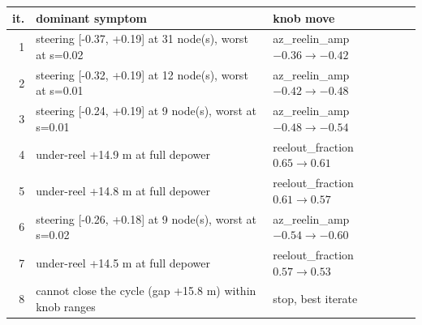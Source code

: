 \begin{tabular}{rp{}l}
\toprule
it. & dominant symptom & knob move \\
\midrule
1 & steering [-0.37, +0.19] at 31 node(s), worst at s=0.02 & az\_reelin\_amp $-0.36\to-0.42$ \\
2 & steering [-0.32, +0.19] at 12 node(s), worst at s=0.01 & az\_reelin\_amp $-0.42\to-0.48$ \\
3 & steering [-0.24, +0.19] at 9 node(s), worst at s=0.01 & az\_reelin\_amp $-0.48\to-0.54$ \\
4 & under-reel +14.9 m at full depower & reelout\_fraction $0.65\to0.61$ \\
5 & under-reel +14.8 m at full depower & reelout\_fraction $0.61\to0.57$ \\
6 & steering [-0.26, +0.18] at 9 node(s), worst at s=0.02 & az\_reelin\_amp $-0.54\to-0.60$ \\
7 & under-reel +14.5 m at full depower & reelout\_fraction $0.57\to0.53$ \\
8 & cannot close the cycle (gap +15.8 m) within knob ranges & stop, best iterate \\
\bottomrule
\end{tabular}
